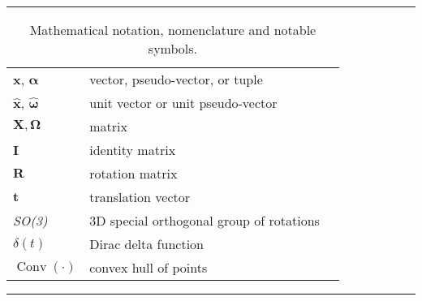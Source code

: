 \begin{table*}[!h]
  \scriptsize
  \centering
  \noindent\rule{\textwidth}{0.5pt}
  \begin{tabular}{lll}
    $\mathbf{x}$, $\bm{\alpha}$ & vector, pseudo-vector, or tuple\\
    $\mathbf{\hat{x}}$, $\bm{\hat{\omega}}$& unit vector or unit pseudo-vector\\
    $\mathbf{X}, \bm{\Omega}$ & matrix \\
    $\mathbf{I}$ & identity matrix \\
    $\mathbf{R}$ & rotation matrix \\
    $\mathbf{t}$ & translation vector \\
    \emph{SO(3)} & 3D special orthogonal group of rotations\\
    $\delta(t)$ & Dirac delta function \\
    $\operatorname{Conv}(\cdot)$ & convex hull of points \\
  \end{tabular}
  \noindent\rule{\textwidth}{0.5pt}
  \caption{Mathematical notation, nomenclature and notable symbols.}
  \label{tab:mathematical_notation}
\end{table*}

